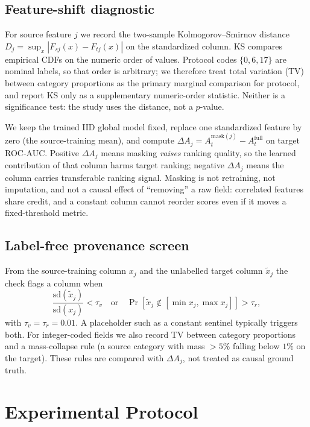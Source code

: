 \documentclass[conference,a4paper]{IEEEtran}
\begin{document}
\subsection{Feature-shift diagnostic}
For source feature $j$ we record the two-sample Kolmogorov--Smirnov distance $D_j=\sup_x|F_{sj}(x)-F_{tj}(x)|$ on the standardized column. KS compares empirical CDFs on the numeric order of values. Protocol codes $\{0,6,17\}$ are nominal labels, so that order is arbitrary; we therefore treat total variation (TV) between category proportions as the primary marginal comparison for protocol, and report KS only as a supplementary numeric-order statistic. Neither is a significance test: the study uses the distance, not a $p$-value.

We keep the trained IID global model fixed, replace one standardized feature by zero (the source-training mean), and compute $\Delta A_j=A^{\mathrm{mask}(j)}_t-A^{\mathrm{full}}_t$ on target ROC-AUC. Positive $\Delta A_j$ means masking \emph{raises} ranking quality, so the learned contribution of that column harms target ranking; negative $\Delta A_j$ means the column carries transferable ranking signal. Masking is not retraining, not imputation, and not a causal effect of ``removing'' a raw field: correlated features share credit, and a constant column cannot reorder scores even if it moves a fixed-threshold metric.

\subsection{Label-free provenance screen}
From the source-training column $x_j$ and the unlabelled target column $\tilde{x}_j$ the check flags a column when
\begin{equation}
\frac{\mathrm{sd}(\tilde{x}_j)}{\mathrm{sd}(x_j)}<\tau_v
\quad\text{or}\quad
\Pr\!\left[\tilde{x}_j\notin[\min x_j,\max x_j]\right]>\tau_r,
\end{equation}
with $\tau_v=\tau_r=0.01$. A placeholder such as a constant sentinel typically triggers both. For integer-coded fields we also record TV between category proportions and a mass-collapse rule (a source category with mass $>5\%$ falling below $1\%$ on the target). These rules are compared with $\Delta A_j$, not treated as causal ground truth.

\section{Experimental Protocol}
\end{document}

